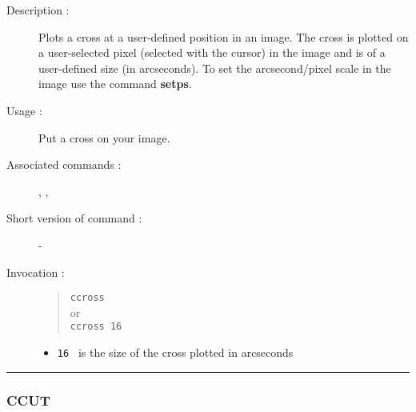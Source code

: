 \begin{description}

\item[Description :] Plots a cross at a user-defined position in an image.
The cross is plotted on a user-selected pixel (selected with the
cursor) in the image and is of a user-defined size (in arcseconds).  To
set the arcsecond/pixel scale in the image use the command {\bf setps}.

\item[Usage :] Put a cross on your image.
\item[Associated commands :] {\tt {}},
{\tt {}}, {\tt {}}
\item[Short version of command :] -
\item[Invocation :]

\begin{quote}{\tt  ccross }\\
or \\
{\tt  ccross 16 }
\end{quote}

\begin{itemize}

\item {\tt 16 } is the size of the cross plotted in arcseconds

\end{itemize}

\end{description}

\hrule
\subsubsection*{\label{CCUT}CCUT}

